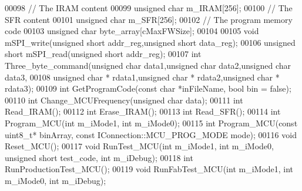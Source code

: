 \begin{DoxyCode}
00098         \textcolor{comment}{// The IRAM content}
00099         \textcolor{keywordtype}{unsigned} \textcolor{keywordtype}{char} m_IRAM[256];
00100         \textcolor{comment}{// The SFR content}
00101         \textcolor{keywordtype}{unsigned} \textcolor{keywordtype}{char} m_SFR[256];
00102         \textcolor{comment}{// The program memory code}
00103         \textcolor{keywordtype}{unsigned} \textcolor{keywordtype}{char} byte_array[cMaxFWSize];
00104 
00105         \textcolor{keywordtype}{void} mSPI_write(\textcolor{keywordtype}{unsigned} \textcolor{keywordtype}{short} addr\_reg,\textcolor{keywordtype}{unsigned} \textcolor{keywordtype}{short} data\_reg);
00106         \textcolor{keywordtype}{unsigned} \textcolor{keywordtype}{short} mSPI_read(\textcolor{keywordtype}{unsigned} \textcolor{keywordtype}{short} addr\_reg);
00107         \textcolor{keywordtype}{int} Three_byte_command(\textcolor{keywordtype}{unsigned} \textcolor{keywordtype}{char} data1,\textcolor{keywordtype}{unsigned} \textcolor{keywordtype}{char} data2,\textcolor{keywordtype}{unsigned} \textcolor{keywordtype}{char} data3,
00108         \textcolor{keywordtype}{unsigned} \textcolor{keywordtype}{char} * rdata1,\textcolor{keywordtype}{unsigned} \textcolor{keywordtype}{char} * rdata2,\textcolor{keywordtype}{unsigned} \textcolor{keywordtype}{char} * rdata3);
00109         \textcolor{keywordtype}{int} GetProgramCode(\textcolor{keyword}{const} \textcolor{keywordtype}{char} *inFileName, \textcolor{keywordtype}{bool} bin = \textcolor{keyword}{false});
00110         \textcolor{keywordtype}{int} Change_MCUFrequency(\textcolor{keywordtype}{unsigned} \textcolor{keywordtype}{char} data);
00111         \textcolor{keywordtype}{int} Read_IRAM();
00112         \textcolor{keywordtype}{int} Erase_IRAM();
00113         \textcolor{keywordtype}{int} Read_SFR();
00114         \textcolor{keywordtype}{int} Program_MCU(\textcolor{keywordtype}{int} m\_iMode1, \textcolor{keywordtype}{int} m\_iMode0);
00115         \textcolor{keywordtype}{int} Program_MCU(\textcolor{keyword}{const} uint8\_t* binArray, \textcolor{keyword}{const} 
      IConnection::MCU_PROG_MODE mode);
00116         \textcolor{keywordtype}{void} Reset_MCU();
00117         \textcolor{keywordtype}{void} RunTest_MCU(\textcolor{keywordtype}{int} m\_iMode1, \textcolor{keywordtype}{int} m\_iMode0, \textcolor{keywordtype}{unsigned} \textcolor{keywordtype}{short} test\_code, \textcolor{keywordtype}{int} m\_iDebug);
00118         \textcolor{keywordtype}{int} RunProductionTest_MCU();
00119         \textcolor{keywordtype}{void} RunFabTest_MCU(\textcolor{keywordtype}{int} m\_iMode1, \textcolor{keywordtype}{int} m\_iMode0, \textcolor{keywordtype}{int} m\_iDebug);

\end{DoxyCode}
